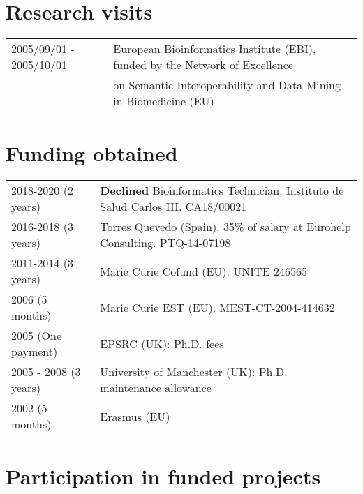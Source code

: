\documentclass[11pt,fullpage]{article}
\begin{document}
\section*{Research visits}

\begin{tabular}{ll}
 2005/09/01 - 2005/10/01 & European Bioinformatics Institute (EBI), funded by the Network of Excellence \\
      & on Semantic Interoperability and Data Mining in Biomedicine (EU)

\end{tabular}

\section*{Funding obtained}

\begin{tabular}{ll}
  2018-2020 (2 years) & {\bf Declined} Bioinformatics Technician. Instituto de Salud Carlos III. CA18/00021 \\
  2016-2018 (3 years) & Torres Quevedo (Spain). 35\% of salary at Eurohelp Consulting. PTQ-14-07198 \\
	2011-2014 (3 years) & Marie Curie Cofund (EU). UNITE 246565 \\
	2006 (5 months) & Marie Curie EST (EU). MEST-CT-2004-414632 \\
	2005 (One payment) & EPSRC (UK): Ph.D. fees \\
	2005 - 2008 (3 years) & University of Manchester (UK): Ph.D. maintenance allowance \\
	2002 (5 months) & Erasmus (EU) \\
\end{tabular}

\section*{Participation in funded projects}
\end{document}

